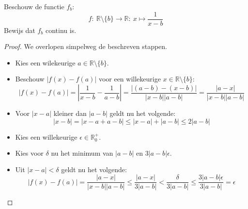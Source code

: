 \documentclass[main.tex]{subfiles}
\begin{document}
Beschouw de functie $f_{b}$:
\[ f:\ \mathbb{R}\setminus \{ b \} \rightarrow \mathbb{R}:\ x \mapsto \frac{1}{x-b} \]
Bewijs dat $f_{b}$ continu is.

\begin{proof}
  We overlopen simpelweg de beschreven stappen.
  \begin{itemize}
  \item Kies een wilekeurige $a \in \mathbb{R}\setminus \{ b \}$.
  \item Beschouw $|f(x)-f(a)|$ voor een willekeurige $x \in \mathbb{R}\setminus \{ b \}$:
    \[ |f(x)-f(a)| = \left|\frac{1}{x-b} - \frac{1}{a-b}\right| = \frac{|(a-b) - (x-b)|}{|x-b||a-b|} = \frac{|a-x|}{|x-b||a-b|} \]
  \item Voor $|x-a|$ kleiner dan $|a-b|$ geldt nu het volgende:
    \[ |x-b| = |x-a+a-b| \le |x-a|+|a-b| \le 2|a-b| \]
  \item Kies een willekeurige $\epsilon \in \mathbb{R}_{0}^{+}$.
  \item Kies voor $\delta$ nu het minimum van $|a-b|$ en $3|a-b|\epsilon$.
  \item Uit $|x-a| < \delta$ geldt nu het volgende:
    \[ |f(x)-f(a)| = \frac{|a-x|}{|x-b||a-b|} \le \frac{|a-x|}{3|a-b|} < \frac{\delta}{3|a-b|} \le \frac{3|a-b|\epsilon}{3|a-b|} = \epsilon \]
  \end{itemize}
\end{proof}
\feed
\end{document}
